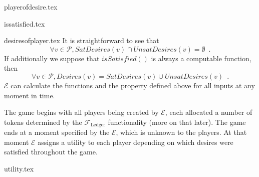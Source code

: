   {playerofdesire.tex}

  {issatisfied.tex}

  {desiresofplayer.tex}
  It is straightforward to see that
  \begin{equation*}
    \forall v \in \mathcal{P}, SatDesires\left(v\right) \cap UnsatDesires\left(v\right) =
    \emptyset \enspace.
  \end{equation*}
  If additionally we suppose that $isSatisfied\left(\right)$ is always a computable
  function, then
  \begin{equation*}
    \forall v \in \mathcal{P}, Desires\left(v\right) = SatDesires\left(v\right) \cup
    UnsatDesires\left(v\right) \enspace.
  \end{equation*}
  $\mathcal{E}$ can calculate the functions and the property defined above for all inputs
  at any moment in time.

  The game begins with all players being created by $\mathcal{E}$, each allocated a number
  of tokens determined by the $\mathcal{F}_{\mathrm{Ledger}}$ functionality (more on that
  later).  The game ends at a moment specified by the $\mathcal{E}$, which is unknown to
  the players. At that moment $\mathcal{E}$ assigns a utility to each player depending on
  which desires were satisfied throughout the game.

  {utility.tex}
